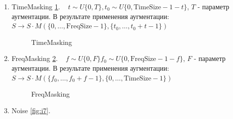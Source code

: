 \documentclass[12pt, fleqn]{article}
\begin{document}
	\begin{enumerate}
		\item TimeMasking \ref{fig:i5}. ~\cite{b1} \newline 
		$t \sim U\{0, T\}, t_0 \sim U\{0, \text{TimeSize} - 1 - t\}$, $T$ - параметр аугментации. \newline 
		В результате применения аугментации: \newline
		$S \rightarrow S \cdot M(\{0, \ldots, \text{FreqSize} - 1\}, \{t_0, \ldots, t_0 + t - 1\}) $
		\begin{figure}[h]
			\caption{TimeMasking}
			\label{fig:i5}
		\end{figure}
		\item FreqMasking \ref{fig:i6}. ~\cite{b1} \newline
		$f \sim U\{0, F\} f_0 \sim U\{0, \text{FreqSize} - 1 - f\}$, $F$ - параметр аугментации. \newline
		В результате применения аугментации: \newline
		$S \rightarrow S \cdot M(\{f_0, \ldots, f_0 + f - 1\}, \{0, \ldots, \text{TimeSize} - 1\}) $
		\begin{figure}[h]
			\caption{FreqMasking}
			\label{fig:i6}
		\end{figure}
		\item Noise \ref{fig:i7}. ~\cite{b2} \newline 

\end{enumerate}
\end{document}
